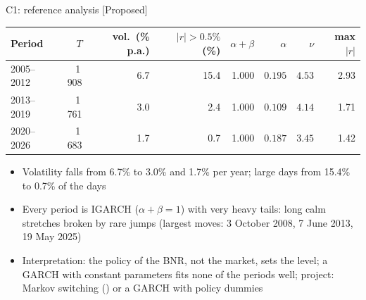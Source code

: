 \ifsolutions
\begin{frame}{C1: reference analysis [Proposed]}
\itemsize{\footnotesize}
\begin{center}
\scriptsize
\begin{tabular}{lrrrrrrr}
\toprule
Period & $T$ & vol.\ (\% p.a.) & $|r| > 0.5\%$ (\%) & $\alpha + \beta$ & $\alpha$ & $\nu$ & max $|r|$ \\
\midrule
2005--2012 & 1\,908 & 6.7 & 15.4 & 1.000 & $0.195$ & $4.53$ & 2.93 \\
2013--2019 & 1\,761 & 3.0 & 2.4 & 1.000 & $0.109$ & $4.14$ & 1.71 \\
2020--2026 & 1\,683 & 1.7 & 0.7 & 1.000 & $0.187$ & $3.45$ & 1.42 \\
\bottomrule
\end{tabular}
\end{center}
\begin{itemize}
    \item Volatility falls from 6.7\% to 3.0\% and 1.7\% per year; large days from 15.4\% to 0.7\% of the days
    \item Every period is IGARCH ($\alpha + \beta = 1$) with very heavy tails: long calm stretches broken by rare jumps (largest moves: 3 October 2008, 7 June 2013, 19 May 2025)
    \item Interpretation: the policy of the BNR, not the market, sets the level; a GARCH with constant parameters fits none of the periods well; project: Markov switching () or a GARCH with policy dummies
\end{itemize}
\end{frame}
\fi


